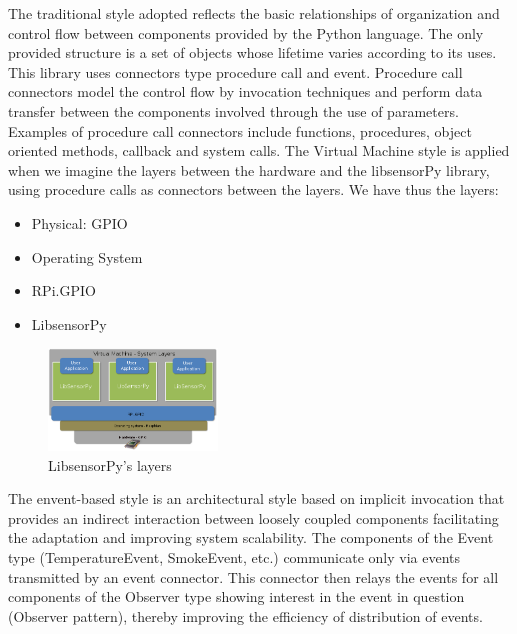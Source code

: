 \documentclass{acm_proc_article-sp}
\begin{document}
The traditional style adopted reflects the basic relationships of organization and control flow between components provided by the Python language. The only provided structure is a set of objects whose lifetime varies according to its uses. This library uses connectors type procedure call and event. Procedure call connectors model the control flow by invocation techniques and perform data transfer between the components involved through the use of parameters. Examples of procedure call connectors include functions, procedures,  object oriented methods, callback and system calls.
\newline
\newline
The Virtual Machine style is applied when we imagine the layers between the hardware and the libsensorPy library, using procedure calls as connectors between the layers. We have thus the layers:
\begin{itemize}
\item Physical: GPIO
\item Operating System
\item RPi.GPIO
\item LibsensorPy
\end{itemize}

\begin{figure}[h]
\centering
    \includegraphics[width=0.4\textwidth,natwidth=610,natheight=642]{pictures/machinelayers.png}
    \caption{LibsensorPy's layers}
    \label{fig:layers}
\end{figure}

The envent-based style is an architectural style based on implicit invocation that provides an indirect interaction between loosely coupled components facilitating the adaptation and improving system scalability. The components of the Event type (TemperatureEvent, SmokeEvent, etc.) communicate only via events transmitted by an event connector. This connector then relays the events for all components of the Observer type showing interest in the event in question (Observer pattern), thereby improving the efficiency of distribution of events.
\end{document}
